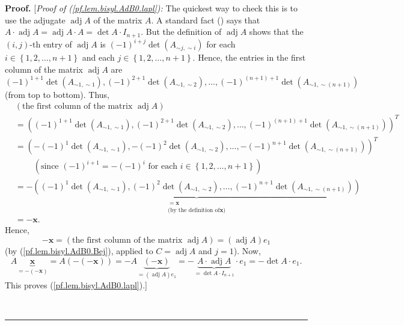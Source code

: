 \documentclass[numbers=enddot,12pt,final,onecolumn,notitlepage]{scrartcl}%
\theoremstyle{definition}
\newenvironment{proof}[1][Proof]{\noindent\textbf{#1.} }{\ \rule{0.5em}{0.5em}}
\newenvironment{verlong}{}{}
\begin{document}
\begin{proof}
\begin{verlong}
[\textit{Proof of (\ref{pf.lem.bisyl.AdB0.lapl}):} The quickest way to check
this is to use the adjugate $\operatorname*{adj}A$ of the matrix $A$. A
standard fact (\cite[Theorem 6.100]{detnotes}) says that $A\cdot
\operatorname*{adj}A=\operatorname*{adj}A\cdot A=\det A\cdot I_{n+1}$. But the
definition of $\operatorname*{adj}A$ shows that the $\left(  i,j\right)  $-th
entry of $\operatorname*{adj}A$ is $\left(  -1\right)  ^{i+j}\det\left(
A_{\sim j,\sim i}\right)  $ for each $i\in\left\{  1,2,\ldots,n+1\right\}  $
and each $j\in\left\{  1,2,\ldots,n+1\right\}  $. Hence, the entries in the
first column of the matrix $\operatorname*{adj}A$ are $\left(  -1\right)
^{1+1}\det\left(  A_{\sim1,\sim1}\right)  ,\left(  -1\right)  ^{2+1}%
\det\left(  A_{\sim1,\sim2}\right)  ,\ldots,\left(  -1\right)  ^{\left(
n+1\right)  +1}\det\left(  A_{\sim1,\sim\left(  n+1\right)  }\right)  $ (from
top to bottom). Thus,
\begin{align*}
&  \left(  \text{the first column of the matrix }\operatorname*{adj}A\right)
\\
&  =\left(  \left(  -1\right)  ^{1+1}\det\left(  A_{\sim1,\sim1}\right)
,\left(  -1\right)  ^{2+1}\det\left(  A_{\sim1,\sim2}\right)  ,\ldots,\left(
-1\right)  ^{\left(  n+1\right)  +1}\det\left(  A_{\sim1,\sim\left(
n+1\right)  }\right)  \right)  ^{T}\\
&  =\left(  -\left(  -1\right)  ^{1}\det\left(  A_{\sim1,\sim1}\right)
,-\left(  -1\right)  ^{2}\det\left(  A_{\sim1,\sim2}\right)  ,\ldots,-\left(
-1\right)  ^{n+1}\det\left(  A_{\sim1,\sim\left(  n+1\right)  }\right)
\right)  ^{T}\\
&  \ \ \ \ \ \ \ \ \ \ \left(  \text{since }\left(  -1\right)  ^{i+1}=-\left(
-1\right)  ^{i}\text{ for each }i\in\left\{  1,2,\ldots,n+1\right\}  \right)
\\
&  =-\underbrace{\left(  \left(  -1\right)  ^{1}\det\left(  A_{\sim1,\sim
1}\right)  ,\left(  -1\right)  ^{2}\det\left(  A_{\sim1,\sim2}\right)
,\ldots,\left(  -1\right)  ^{n+1}\det\left(  A_{\sim1,\sim\left(  n+1\right)
}\right)  \right)  }_{\substack{=\mathbf{x}\\\text{(by the definition of
}\mathbf{x}\text{)}}}\\
&  =-\mathbf{x}.
\end{align*}
Hence,%
\[
-\mathbf{x}=\left(  \text{the first column of the matrix }\operatorname*{adj}%
A\right)  =\left(  \operatorname*{adj}A\right)  e_{1}%
\]
(by (\ref{pf.lem.bisyl.AdB0.Bej}), applied to $C=\operatorname*{adj}A$ and
$j=1$). Now,%
\[
A\underbrace{\mathbf{x}}_{=-\left(  -\mathbf{x}\right)  }=A\left(  -\left(
-\mathbf{x}\right)  \right)  =-A\underbrace{\left(  -\mathbf{x}\right)
}_{=\left(  \operatorname*{adj}A\right)  e_{1}}=-\underbrace{A\cdot
\operatorname*{adj}A}_{=\det A\cdot I_{n+1}}\cdot e_{1}=-\det A\cdot e_{1}.
\]
This proves (\ref{pf.lem.bisyl.AdB0.lapl}).]
\end{verlong}


\end{proof}
\end{document}
